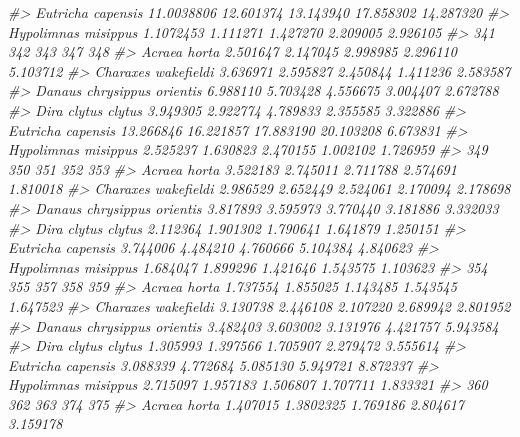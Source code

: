 \documentclass[
]{article}
\newenvironment{Shaded}{\begin{snugshade}}{\end{snugshade}}
\newcommand{\CommentTok}[1]{\textcolor[rgb]{0.56,0.35,0.01}{\textit{#1}}}
\begin{document}
\begin{Shaded}
\begin{Highlighting}[]
\CommentTok{\#\textgreater{} Eutricha capensis          11.0038806 12.601374 13.143940 17.858302 14.287320}
\CommentTok{\#\textgreater{} Hypolimnas misippus         1.1072453  1.111271  1.427270  2.209005  2.926105}
\CommentTok{\#\textgreater{}                                  341       342       343       347      348}
\CommentTok{\#\textgreater{} Acraea horta                2.501647  2.147045  2.998985  2.296110 5.103712}
\CommentTok{\#\textgreater{} Charaxes wakefieldi         3.636971  2.595827  2.450844  1.411236 2.583587}
\CommentTok{\#\textgreater{} Danaus chrysippus orientis  6.988110  5.703428  4.556675  3.004407 2.672788}
\CommentTok{\#\textgreater{} Dira clytus clytus          3.949305  2.922774  4.789833  2.355585 3.322886}
\CommentTok{\#\textgreater{} Eutricha capensis          13.266846 16.221857 17.883190 20.103208 6.673831}
\CommentTok{\#\textgreater{} Hypolimnas misippus         2.525237  1.630823  2.470155  1.002102 1.726959}
\CommentTok{\#\textgreater{}                                 349      350      351      352      353}
\CommentTok{\#\textgreater{} Acraea horta               3.522183 2.745011 2.711788 2.574691 1.810018}
\CommentTok{\#\textgreater{} Charaxes wakefieldi        2.986529 2.652449 2.524061 2.170094 2.178698}
\CommentTok{\#\textgreater{} Danaus chrysippus orientis 3.817893 3.595973 3.770440 3.181886 3.332033}
\CommentTok{\#\textgreater{} Dira clytus clytus         2.112364 1.901302 1.790641 1.641879 1.250151}
\CommentTok{\#\textgreater{} Eutricha capensis          3.744006 4.484210 4.760666 5.104384 4.840623}
\CommentTok{\#\textgreater{} Hypolimnas misippus        1.684047 1.899296 1.421646 1.543575 1.103623}
\CommentTok{\#\textgreater{}                                 354      355      357      358      359}
\CommentTok{\#\textgreater{} Acraea horta               1.737554 1.855025 1.143485 1.543545 1.647523}
\CommentTok{\#\textgreater{} Charaxes wakefieldi        3.130738 2.446108 2.107220 2.689942 2.801952}
\CommentTok{\#\textgreater{} Danaus chrysippus orientis 3.482403 3.603002 3.131976 4.421757 5.943584}
\CommentTok{\#\textgreater{} Dira clytus clytus         1.305993 1.397566 1.705907 2.279472 3.555614}
\CommentTok{\#\textgreater{} Eutricha capensis          3.088339 4.772684 5.085130 5.949721 8.872337}
\CommentTok{\#\textgreater{} Hypolimnas misippus        2.715097 1.957183 1.506807 1.707711 1.833321}
\CommentTok{\#\textgreater{}                                  360        362      363       374       375}
\CommentTok{\#\textgreater{} Acraea horta                1.407015  1.3802325 1.769186  2.804617  3.159178}

\end{Highlighting}
\end{Shaded}
\end{document}
